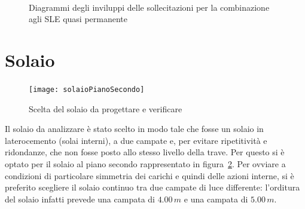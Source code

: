 \begin{figure}
 \centering
 \\
 \caption{Diagrammi degli inviluppi delle sollecitazioni per la combinazione agli SLE quasi permanente}
 \label{fig:envelope_sleQP}
\end{figure}

\cleardoublepage

\section{Solaio}\label{sec:azioniSolaio}

\begin{figure}
	\centering
	\texttt{[image: solaioPianoSecondo]}
	\caption{Scelta del solaio da progettare e verificare}
	\label{fig:solaioPianoSecondo}
\end{figure}

Il solaio da analizzare è stato scelto in modo tale che fosse un solaio in laterocemento (solai interni), a due campate e, per evitare ripetitività e ridondanze, che non fosse posto allo stesso livello della trave. Per questo si è optato per il solaio al piano secondo rappresentato in figura~\ref{fig:solaioPianoSecondo}. Per ovviare a condizioni di particolare simmetria dei carichi e quindi delle azioni interne, si è preferito scegliere il solaio continuo tra due campate di luce differente: l'orditura del solaio infatti prevede una campata di $4.00\,m$ e una campata di $5.00\,m$.

